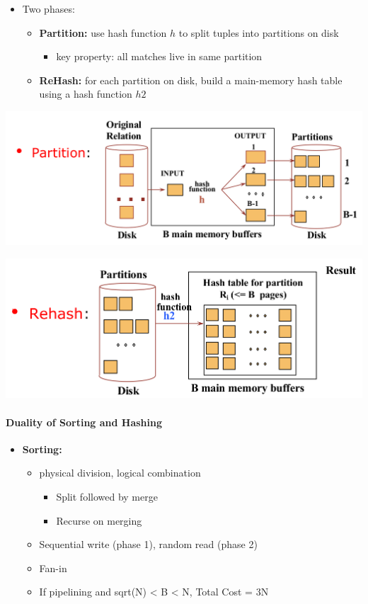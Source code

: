 \begin{itemize}
\item Two phases:
  \begin{itemize}
  \item \textbf{Partition:} use hash function $h$ to split tuples into
    partitions on disk
    \begin{itemize}
    \item key property: all matches live in same partition
    \end{itemize}

  \item \textbf{ReHash:} for each partition on disk, build a
    main-memory hash table using a hash function $h2$
  \end{itemize}
\end{itemize}

\includegraphics[scale=0.15]{graphics/hashing-partition.png}

\includegraphics[scale=0.15]{graphics/hashing-rehash.png}

\paragraph{Duality of Sorting and Hashing}
\begin{itemize}
\item \textbf{Sorting:}
  \begin{itemize}
  \item physical division, logical combination
    \begin{itemize}
    \item Split followed by merge
    \item Recurse on merging
    \end{itemize}
  \item Sequential write (phase 1), random read (phase 2)
  \item Fan-in
  \item If pipelining and sqrt(N) < B < N, Total Cost = 3N
  \end{itemize}
\end{itemize}

